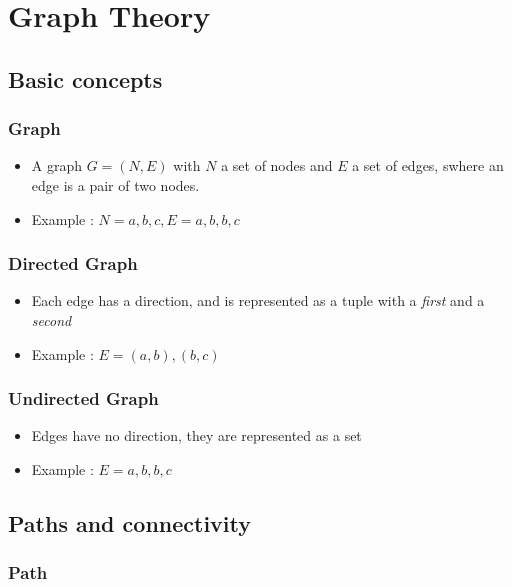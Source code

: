 \chapter{Graph Theory}

\section{Basic concepts}

\subsection{Graph}

\begin{itemize}
\item A graph $G = (N, E)$ with $N$ a set of nodes and $E$ a set of edges, swhere an edge is a pair of two nodes.
\item Example : $N = {a, b, c}, E = {{a, b}, {b, c}}$
\end{itemize}

\subsection{Directed Graph}

\begin{itemize}
\item Each edge has a direction, and is represented as a tuple with a \textit{first} and a \textit{second}
\item Example : $E = {(a, b), (b, c)}$
\end{itemize}

\subsection{Undirected Graph}

\begin{itemize}
\item Edges have no direction, they are represented as a set
\item Example : $E = {{a, b}, {b, c}}$
\end{itemize}

\section{Paths and connectivity}

\subsection{Path}

